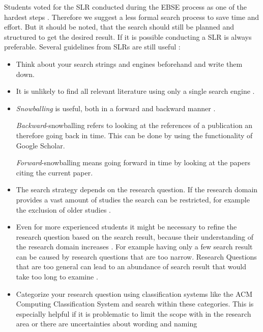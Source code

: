 Students voted for the SLR conducted during the EBSE process as one of the hardest steps \cite{keele2007}. Therefore we suggest a less formal search process to save time and effort. But it should be noted, that the search should still be planned and structured to get the desired result. If it is possible conducting a SLR is always preferable.
\newline
\newline
Several guidelines from SLRs are still useful :
\begin{itemize}
\item Think about your search strings and engines beforehand and write them down.
\item It is unlikely to find all relevant literature using only a single search engine \cite{Brereton2007}. 
\item \emph{Snowballing} is useful, both in a forward and backward manner \cite{Wohlin2014}.

\emph{Backward}-snowballing refers to looking at the references of a publication an therefore going back in time. This can be done by using the  functionality of Google Scholar.

\emph{Forward}-snowballing means going forward in time by looking at the papers citing the current paper.
\item The search strategy depends on the research question. If the research domain provides a vast amount of studies the search can  be restricted, for example the exclusion of older studies \cite{Brereton2007}.
\item Even for more experienced students it might be necessary to refine the research question based on the search result, because their understanding of the research domain increases \cite{Brereton2007}. For example having only a few search result can be caused by research questions that are too narrow. Research Questions that are too general can lead to an abundance of search result that would take too long to examine . 
\item Categorize your research question using classification systems like the ACM Computing Classification System and search within these categories. This is especially helpful if it is problematic to limit the scope with in the research area or there are uncertainties about wording and naming
\end{itemize} 

